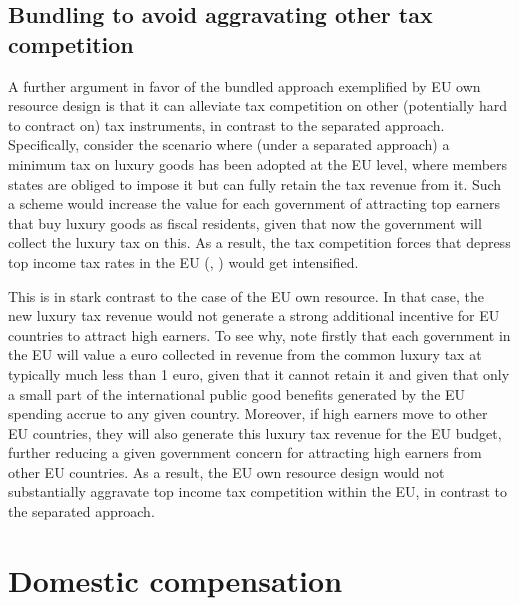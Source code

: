 \documentclass{article}
\begin{document}
\subsection{Bundling to avoid aggravating other tax competition}
A further argument in favor of the bundled approach exemplified by EU own resource design is that it can alleviate tax competition on other (potentially hard to contract on) tax instruments, in contrast to the separated approach. Specifically, consider the scenario where (under a separated approach) a minimum tax on luxury goods has been adopted at the EU level, where members states are obliged to impose it but can fully retain the tax revenue from it. Such a scheme would increase the value for each government of attracting top earners that buy luxury goods as fiscal residents, given that now the government will collect the luxury tax on this. As a result, the tax competition forces that depress top income tax rates in the EU (\citet{munoz2021european}, \citet{kleven2011taxation}) would get intensified.

This is in stark contrast to the case of the EU own resource. In that case, the new luxury tax revenue would not generate a strong additional incentive for EU countries to attract high earners. To see why, note firstly that each government in the EU will value a euro collected in revenue from the common luxury tax at typically much less than 1 euro, given that it cannot retain it and given that only a small part of the international public good benefits generated by the EU spending accrue to any given country. Moreover, if high earners move to other EU countries, they will also generate this luxury tax revenue for the EU budget, further reducing a given government concern for attracting high earners from other EU countries. As a result, the EU own resource design would not substantially aggravate top income tax competition within the EU, in contrast to the separated approach. %

\section{Domestic compensation} %
\end{document}

